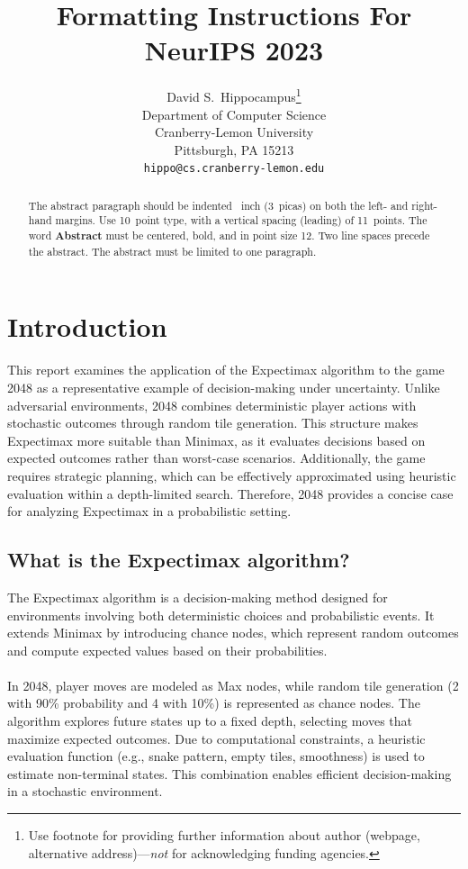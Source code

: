 \documentclass{article}
\title{Formatting Instructions For NeurIPS 2023}
\author{%
  David S.~Hippocampus\thanks{Use footnote for providing further information
    about author (webpage, alternative address)---\emph{not} for acknowledging
    funding agencies.} \\
  Department of Computer Science\\
  Cranberry-Lemon University\\
  Pittsburgh, PA 15213 \\
  \texttt{hippo@cs.cranberry-lemon.edu} \\
}
\begin{document}
\maketitle


\begin{abstract}
  The abstract paragraph should be indented ~inch (3~picas) on
  both the left- and right-hand margins. Use 10~point type, with a vertical
  spacing (leading) of 11~points.  The word \textbf{Abstract} must be centered,
  bold, and in point size 12. Two line spaces precede the abstract. The abstract
  must be limited to one paragraph.
\end{abstract}

\section{Introduction}

This report examines the application of the Expectimax algorithm to the game 2048 as a representative example
of decision-making under uncertainty. Unlike adversarial environments, 2048 combines deterministic player actions
with stochastic outcomes through random tile generation. This structure makes Expectimax more suitable than Minimax,
as it evaluates decisions based on expected outcomes rather than worst-case scenarios. Additionally, the game
requires strategic planning, which can be effectively approximated using heuristic evaluation within a depth-limited
search. Therefore, 2048 provides a concise case for analyzing Expectimax in a probabilistic setting.

\subsection*{What is the Expectimax algorithm?}

The Expectimax algorithm is a decision-making method designed for environments involving both deterministic choices
and probabilistic events. It extends Minimax by introducing chance nodes, which represent random outcomes and compute
expected values based on their probabilities.
\\
\\
In 2048, player moves are modeled as Max nodes, while random tile generation (2 with 90\% probability and 4 with 10\%) is represented as chance nodes. The algorithm explores future states up to a fixed depth, selecting moves that maximize expected outcomes. Due to computational constraints, a heuristic evaluation function (e.g., snake pattern, empty tiles, smoothness) is used to estimate non-terminal states. This combination enables efficient decision-making in a stochastic environment.
\end{document}
